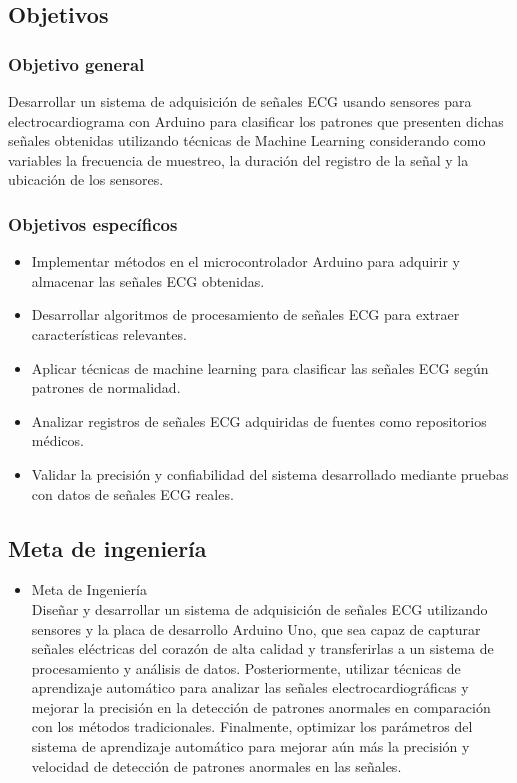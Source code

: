 \subsection{Objetivos}

\subsubsection{Objetivo general}

Desarrollar un sistema de adquisición de señales ECG usando sensores para electrocardiograma con Arduino para clasificar los patrones que presenten dichas señales obtenidas utilizando técnicas de Machine Learning considerando como variables la frecuencia de muestreo, la duración del registro de la señal y la ubicación de los sensores.
\subsubsection{Objetivos específicos}
\begin{itemize}
	\item Implementar métodos en el microcontrolador Arduino para adquirir y almacenar las señales ECG obtenidas.
	\item  Desarrollar algoritmos de procesamiento de señales ECG para extraer características 
		relevantes.
	\item Aplicar técnicas de machine learning para clasificar las señales ECG según patrones de normalidad.
	\item Analizar registros de señales ECG adquiridas de fuentes como repositorios médicos.
	\item  Validar la precisión y confiabilidad del sistema desarrollado mediante pruebas con datos de señales ECG reales.
\end{itemize}
\subsection{Meta de ingeniería}

\begin{itemize}
	\item Meta de Ingeniería\\
	Diseñar y desarrollar un sistema de adquisición de señales ECG utilizando sensores y la placa de desarrollo Arduino Uno, que sea capaz de capturar señales eléctricas del corazón de alta calidad y transferirlas a un sistema de procesamiento y análisis de datos. 
	Posteriormente, utilizar técnicas de aprendizaje automático para analizar las señales electrocardiográficas y mejorar la precisión en la detección de patrones anormales en comparación con los métodos tradicionales. Finalmente, optimizar los parámetros del sistema de aprendizaje automático para mejorar aún más la precisión y velocidad de detección de patrones anormales en las señales.
\end{itemize}

